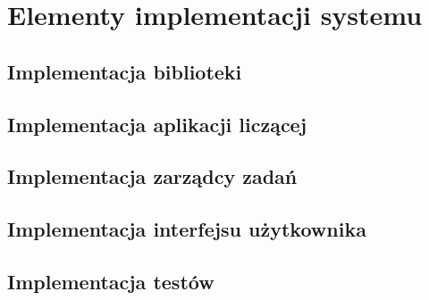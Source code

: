 \documentclass[../thesis.tex]{subfiles}
\begin{document}
\pagestyle{plain}
\chapter{Elementy implementacji systemu}

\section{Implementacja biblioteki}
\section{Implementacja aplikacji liczącej}
\section{Implementacja zarządcy zadań}
\section{Implementacja interfejsu użytkownika}
\section{Implementacja testów}
\end{document}
